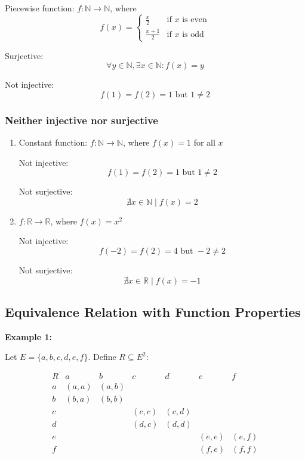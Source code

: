 \documentclass[12pt,a4paper,openany]{article}
\begin{document}
Piecewise function: $f : \mathbb{N} \to \mathbb{N}$, where
\[f(x) = \begin{cases} \frac{x}{2} & \text{if } x \text{ is even} \\[0.5em] \frac{x+1}{2} & \text{if } x \text{ is odd} \end{cases}\]

Surjective: \[\forall y \in \mathbb{N}, \exists x \in \mathbb{N} : f(x) = y\]

Not injective: \[f(1) = f(2) = 1 \text{ but } 1 \neq 2\]

\subsubsection{Neither injective nor surjective}

\begin{enumerate}
\item Constant function: $f : \mathbb{N} \to \mathbb{N}$, where $f(x) = 1$ for all $x$

   Not injective: \[f(1) = f(2) = 1 \text{ but } 1 \neq 2\]

   Not surjective: \[\nexists x \in \mathbb{N} \mid f(x) = 2\]

\item $f : \mathbb{R} \to \mathbb{R}$, where $f(x) = x^2$

   Not injective: \[f(-2) = f(2) = 4 \text{ but } -2 \neq 2\]

   Not surjective: \[\nexists x \in \mathbb{R} \mid f(x) = -1\]
\end{enumerate}

\newpage
\subsection{Equivalence Relation with Function Properties}

\textbf{Example 1:}

Let $E = \{a, b, c, d, e, f\}$. Define $R \subseteq E^2$:

$$
\begin{array}{c|cccccc}
R & a & b & c & d & e & f \\
\hline
a & (a,a) & (a,b) &  &  &  &  \\
b & (b,a) & (b,b) &  &  &  &  \\
c &  &  & (c,c) & (c,d) &  &  \\
d &  &  & (d,c) & (d,d) &  &  \\
e &  &  &  &  & (e,e) & (e,f) \\
f &  &  &  &  & (f,e) & (f,f) \\
\end{array}
$$
\end{document}
